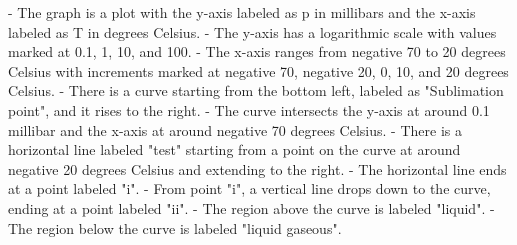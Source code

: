- The graph is a plot with the y-axis labeled as p in millibars and the x-axis labeled as T in degrees Celsius.
- The y-axis has a logarithmic scale with values marked at 0.1, 1, 10, and 100.
- The x-axis ranges from negative 70 to 20 degrees Celsius with increments marked at negative 70, negative 20, 0, 10, and 20 degrees Celsius.
- There is a curve starting from the bottom left, labeled as "Sublimation point", and it rises to the right.
- The curve intersects the y-axis at around 0.1 millibar and the x-axis at around negative 70 degrees Celsius.
- There is a horizontal line labeled "test" starting from a point on the curve at around negative 20 degrees Celsius and extending to the right.
- The horizontal line ends at a point labeled "i".
- From point "i", a vertical line drops down to the curve, ending at a point labeled "ii".
- The region above the curve is labeled "liquid".
- The region below the curve is labeled "liquid gaseous".